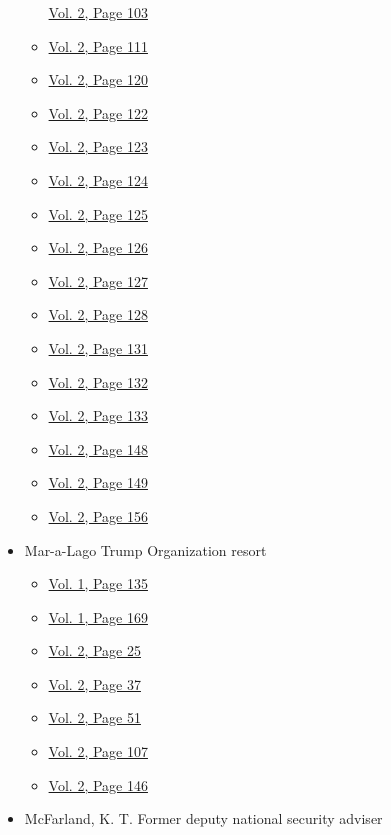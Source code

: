 \begin{itemize}
\begin{itemize}
    \protect\hyperlink{g-page-315}{Vol. 2, Page 103}
  \item
    \protect\hyperlink{g-page-323}{Vol. 2, Page 111}
  \item
    \protect\hyperlink{g-page-332}{Vol. 2, Page 120}
  \item
    \protect\hyperlink{g-page-334}{Vol. 2, Page 122}
  \item
    \protect\hyperlink{g-page-335}{Vol. 2, Page 123}
  \item
    \protect\hyperlink{g-page-336}{Vol. 2, Page 124}
  \item
    \protect\hyperlink{g-page-337}{Vol. 2, Page 125}
  \item
    \protect\hyperlink{g-page-338}{Vol. 2, Page 126}
  \item
    \protect\hyperlink{g-page-339}{Vol. 2, Page 127}
  \item
    \protect\hyperlink{g-page-340}{Vol. 2, Page 128}
  \item
    \protect\hyperlink{g-page-343}{Vol. 2, Page 131}
  \item
    \protect\hyperlink{g-page-344}{Vol. 2, Page 132}
  \item
    \protect\hyperlink{g-page-345}{Vol. 2, Page 133}
  \item
    \protect\hyperlink{g-page-360}{Vol. 2, Page 148}
  \item
    \protect\hyperlink{g-page-361}{Vol. 2, Page 149}
  \item
    \protect\hyperlink{g-page-368}{Vol. 2, Page 156}
  \end{itemize}
\item
  Mar-a-Lago Trump Organization resort

  \begin{itemize}
  \tightlist
  \item
    \protect\hyperlink{g-page-143}{Vol. 1, Page 135}
  \item
    \protect\hyperlink{g-page-177}{Vol. 1, Page 169}
  \item
    \protect\hyperlink{g-page-237}{Vol. 2, Page 25}
  \item
    \protect\hyperlink{g-page-249}{Vol. 2, Page 37}
  \item
    \protect\hyperlink{g-page-263}{Vol. 2, Page 51}
  \item
    \protect\hyperlink{g-page-319}{Vol. 2, Page 107}
  \item
    \protect\hyperlink{g-page-358}{Vol. 2, Page 146}
  \end{itemize}
\item
  McFarland, K. T. Former deputy national security adviser


\end{itemize}
